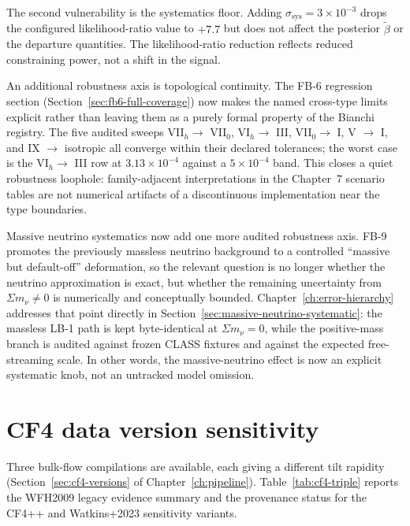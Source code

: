 The second vulnerability is the systematics floor.  Adding
$\sigma_{\mathrm{sys}} = 3 \times 10^{-3}$ drops the configured likelihood-ratio value to
$+7.7$ but does not affect the posterior $\tilde{\beta}$ or the
departure quantities.  The likelihood-ratio reduction reflects reduced
constraining power, not a shift in the signal.

An additional robustness axis is topological continuity.  The FB-6
regression section (Section~\ref{sec:fb6-full-coverage}) now makes the
named cross-type limits explicit rather than leaving them as a purely
formal property of the Bianchi registry.  The five audited sweeps
VII$_h \rightarrow$ VII$_0$, VI$_h \rightarrow$ III,
VII$_0 \rightarrow$ I, V $\rightarrow$ I, and IX $\rightarrow$
isotropic all converge within their declared tolerances; the worst case
is the VI$_h \rightarrow$ III row at $3.13\times 10^{-4}$ against a
$5\times 10^{-4}$ band.  This closes a quiet robustness loophole:
family-adjacent interpretations in the Chapter~7 scenario tables are
not numerical artifacts of a discontinuous implementation near the type
boundaries.

Massive neutrino systematics now add one more audited robustness axis.  FB-9
promotes the previously massless neutrino background to a controlled
``massive but default-off'' deformation, so the relevant question is no
longer whether the neutrino approximation is exact, but whether the
remaining uncertainty from $\Sigma m_\nu \neq 0$ is numerically and
conceptually bounded.  Chapter~\ref{ch:error-hierarchy} addresses that
point directly in Section~\ref{sec:massive-neutrino-systematic}: the
massless LB-1 path is kept byte-identical at $\Sigma m_\nu = 0$, while
the positive-mass branch is audited against frozen CLASS fixtures and
against the expected free-streaming scale.  In other words, the
massive-neutrino effect is now an explicit systematic knob, not an
untracked model omission.


\section{CF4 data version sensitivity}
\label{sec:cf4-sensitivity}

Three bulk-flow compilations are available, each giving a
different tilt rapidity (Section~\ref{sec:cf4-versions} of
Chapter~\ref{ch:pipeline}).
Table~\ref{tab:cf4-triple} reports the WFH2009 legacy evidence
summary and the provenance status for the CF4++ and Watkins+2023
sensitivity variants.

